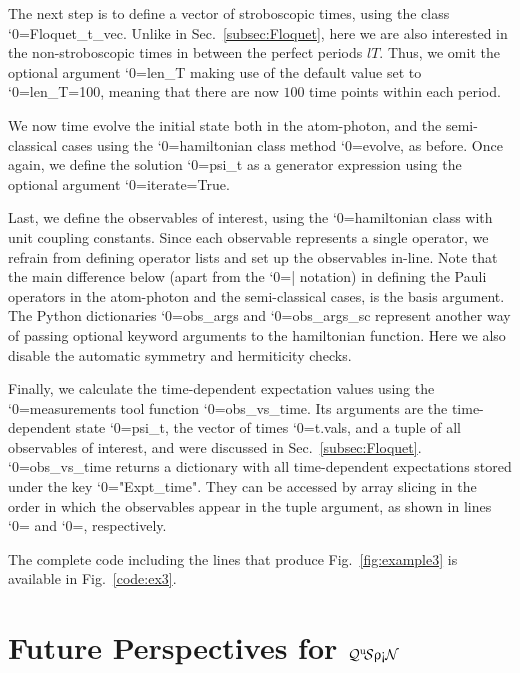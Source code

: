 \documentclass{SciPost}
\newcommand\0{\scalebox{-1}[1]{0}}
\let\svttfamily\ttfamily
\renewcommand\ttfamily{\svttfamily\catcode`0=\active }
\renewcommand\texttt{\bgroup\ttfamily\texttthelp}
\def\texttthelp#1{#1\egroup}
\newcommand{\qspin}{$\mathcal{Q}^{\mathrm{u}}\!\mathcal{S}\uprho\mathrm{\text{\textexclamdown}}\mathcal{N}$}
\begin{document}
% 

The next step is to define a vector of stroboscopic times, using the class \texttt{Floquet\_t\_vec}. Unlike in Sec.~\ref{subsec:Floquet}, here we are also interested in the non-stroboscopic times in between the perfect periods $lT$. Thus, we omit the optional argument \texttt{len\_T} making use of the default value set to \texttt{len\_T=100}, meaning that there are now $100$ time points within each period.
% 

We now time evolve the initial state both in the atom-photon, and the semi-classical cases using the \texttt{hamiltonian} class method \texttt{evolve}, as before. Once again, we define the solution \texttt{psi\_t} as a generator expression using the optional argument \texttt{iterate=True}.
%

Last, we define the observables of interest, using the \texttt{hamiltonian} class with unit coupling constants. Since each observable represents a single operator, we refrain from defining operator lists and set up the observables in-line. Note that the main difference below (apart from the \texttt{|} notation) in defining the Pauli operators in the atom-photon and the semi-classical cases, is the basis argument. The Python dictionaries \texttt{obs\_args} and \texttt{obs\_args\_sc} represent another way of passing optional keyword arguments to the hamiltonian function. Here we also disable the automatic symmetry and hermiticity checks.
% 

Finally, we calculate the time-dependent expectation values using the \texttt{measurements} tool function \texttt{obs\_vs\_time}. Its arguments are the time-dependent state \texttt{psi\_t}, the vector of times \texttt{t.vals}, and a tuple of all observables of interest, and were discussed in Sec.~\ref{subsec:Floquet}. \texttt{obs\_vs\_time} returns a dictionary with all time-dependent expectations stored under the key \texttt{"Expt\_time"}. They can be accessed by array slicing in the order in which the observables appear in the tuple argument, as shown in lines \texttt{75} and \texttt{78}, respectively. 

%
The complete code including the lines that produce Fig.~\ref{fig:example3} is available in Fig.~\ref{code:ex3}.

\section{Future Perspectives for \qspin}
\label{sec:outro}
\end{document}
